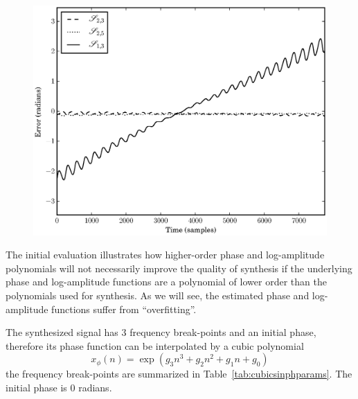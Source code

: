 \begin{figure}[!t]
    \centering
    \includegraphics[width=\figwidthscale\textwidth]{plots/mq_mod_err_comp_phase_err.eps}
\end{figure}

The initial evaluation illustrates how higher-order phase and log-amplitude polynomials will not
necessarily improve the quality of synthesis if the underlying phase and
log-amplitude functions are
a polynomial of lower order than the polynomials used for synthesis. As we will
see, the estimated phase and log-amplitude functions suffer from ``overfitting''.

The synthesized signal has 3 frequency break-points and an initial phase,
therefore its phase function can be interpolated by a cubic polynomial
\[
    x_{\phi}(n) = \exp \left(g_3 n^{3} + g_2 n^{2} + g_1 n + g_0 \right)
\]
the frequency break-points are summarized in Table~\ref{tab:cubicsinphparams}. The
initial phase is $0$ radians.

